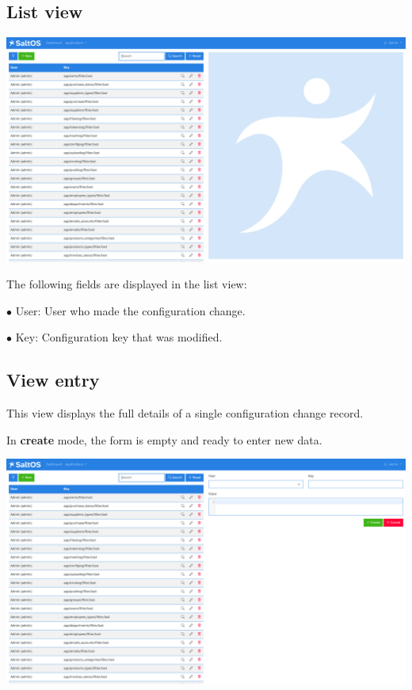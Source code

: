\documentclass[a4paper]{article}
\begin{document}
\hypertarget{toc8}{}
\subsection{List view}

\begin{center}\includegraphics[width=1\textwidth]{../ujest/snaps/test-screenshots-js-screenshots-common-configlog-list-en-us-1-snap.png}\end{center}

The following fields are displayed in the list view:

\begin{compactitem}
\item[\color{myblue}$\bullet$] User: User who made the configuration change.
\item[\color{myblue}$\bullet$] Key: Configuration key that was modified.
\end{compactitem}

\hypertarget{toc9}{}
\subsection{View entry}

This view displays the full details of a single configuration change record.

In \textbf{create} mode, the form is empty and ready to enter new data.

\begin{center}\includegraphics[width=1\textwidth]{../ujest/snaps/test-screenshots-js-screenshots-common-configlog-create-en-us-1-snap.png}\end{center}
\end{document}
